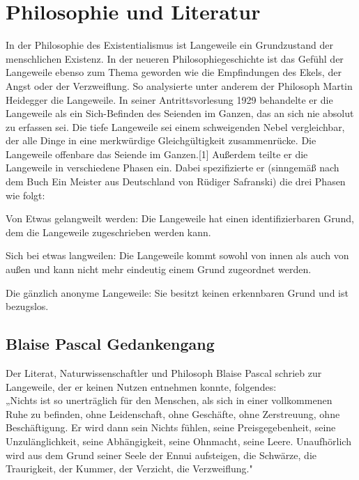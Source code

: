 
\chapter{Philosophie und Literatur}
\label{chapter-evaluation}

In der Philosophie des Existentialismus ist Langeweile ein Grundzustand der menschlichen Existenz.
In der neueren Philosophiegeschichte ist das Gefühl der Langeweile ebenso zum Thema geworden wie die Empfindungen des Ekels, der Angst oder der Verzweiflung.
So analysierte unter anderem der Philosoph Martin Heidegger die Langeweile. In seiner Antrittsvorlesung 1929 behandelte er die Langeweile als ein Sich-Befinden des Seienden im Ganzen, das an sich nie absolut zu erfassen sei. Die tiefe Langeweile sei einem schweigenden Nebel vergleichbar, der alle Dinge in eine merkwürdige Gleichgültigkeit zusammenrücke. Die Langeweile offenbare das Seiende im Ganzen.[1] Außerdem teilte er die Langeweile in verschiedene Phasen ein. Dabei spezifizierte er (sinngemäß nach dem Buch Ein Meister aus Deutschland von Rüdiger Safranski) die drei Phasen wie folgt:
\begin{compactitem}[--]
  \item Von Etwas gelangweilt werden: Die Langeweile hat einen identifizierbaren Grund, dem die Langeweile zugeschrieben werden kann.
  \item Sich bei etwas langweilen: Die Langeweile kommt sowohl von innen als auch von außen und kann nicht mehr eindeutig einem Grund zugeordnet werden.
  \item Die gänzlich anonyme Langeweile: Sie besitzt keinen erkennbaren Grund und ist bezugslos.
\end{compactitem}

\section{Blaise Pascal Gedankengang}

Der Literat, Naturwissenschaftler und Philosoph Blaise Pascal schrieb zur Langeweile, der er keinen Nutzen entnehmen konnte, folgendes: \\
„Nichts ist so unerträglich für den Menschen, als sich in einer vollkommenen Ruhe zu befinden, ohne Leidenschaft, ohne Geschäfte, ohne Zerstreuung, ohne Beschäftigung. Er wird dann sein Nichts fühlen, seine Preisgegebenheit, seine Unzulänglichkeit, seine Abhängigkeit, seine Ohnmacht, seine Leere. Unaufhörlich wird aus dem Grund seiner Seele der Ennui aufsteigen, die Schwärze, die Traurigkeit, der Kummer, der Verzicht, die Verzweiflung."

